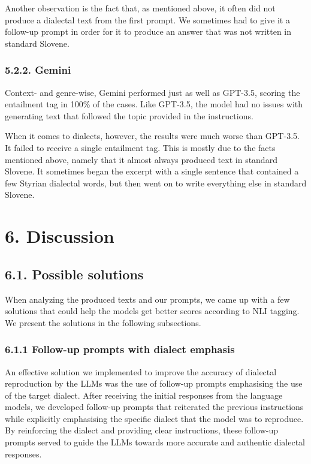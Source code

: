 \documentclass[fleqn,moreauthors,10pt]{ds_report}
\begin{document}
    Another observation is the fact that, as mentioned above, it often did not produce a dialectal text from the first prompt. We sometimes had to give it a follow-up prompt in order for it to produce an answer that was not written in standard Slovene.

\subsubsection{5.2.2. Gemini}

    Context- and genre-wise, Gemini performed just as well as GPT-3.5, scoring the entailment tag in 100\% of the cases. Like GPT-3.5, the model had no issues with generating text that followed the topic provided in the instructions.

    When it comes to dialects, however, the results were much worse than GPT-3.5. It failed to receive a single entailment tag. This is mostly due to the facts mentioned above, namely that it almost always produced text in standard Slovene. It sometimes began the excerpt with a single sentence that contained a few Styrian dialectal words, but then went on to write everything else in standard Slovene.


\section*{6. Discussion}

\subsection{6.1. Possible solutions}

    When analyzing the produced texts and our prompts, we came up with a few solutions that could help the models get better scores according to NLI tagging. We present the solutions in the following subsections.

\subsubsection{6.1.1 Follow-up prompts with dialect emphasis}

    An effective solution we implemented to improve the accuracy of dialectal reproduction by the LLMs was the use of follow-up prompts emphasising the use of the target dialect. After receiving the initial responses from the language models, we developed follow-up prompts that reiterated the previous instructions while explicitly emphasising the specific dialect that the model was to reproduce. By reinforcing the dialect and providing clear instructions, these follow-up prompts served to guide the LLMs towards more accurate and authentic dialectal responses.
\end{document}
